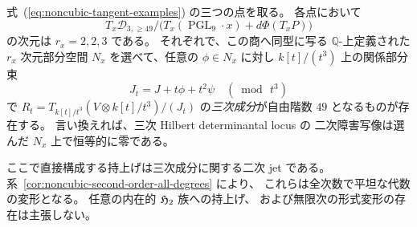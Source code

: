 \begin{proposition}
\label{prop:noncubic-transverse-second-order}
式~(\ref{eq:noncubic-tangent-examples}) の三つの点を取る。
各点において
\[
 T_x\mathcal D_{3,\ge49}
 \big/
 \bigl(T_x(\operatorname{PGL}_9\cdot x)
     +d\Phi(T_xP)\bigr)
\]
の次元は $r_x=2,2,3$ である。
それぞれで、この商へ同型に写る
$\mathbb Q$-上定義された $r_x$ 次元部分空間 $N_x$
を選べて、任意の $\phi\in N_x$ に対し
$k[t]/(t^3)$ 上の関係部分束
\[
 J_t=J+t\phi+t^2\psi
 \quad(\bmod\,t^3)
\]
で $R_t=T_{k[t]/t^3}(V\otimes k[t]/t^3)/(J_t)$
の\emph{三次成分}が自由階数 $49$ となるものが存在する。
言い換えれば、三次 Hilbert determinantal locus の
二次障害写像は選んだ $N_x$ 上で恒等的に零である。

ここで直接構成する持上げは三次成分に関する二次 jet である。
系~\ref{cor:noncubic-second-order-all-degrees} により、
これらは全次数で平坦な代数の変形となる。
任意の内在的 $\mathfrak H_2$ 族への持上げ、
および無限次の形式変形の存在は主張しない。
\end{proposition}
